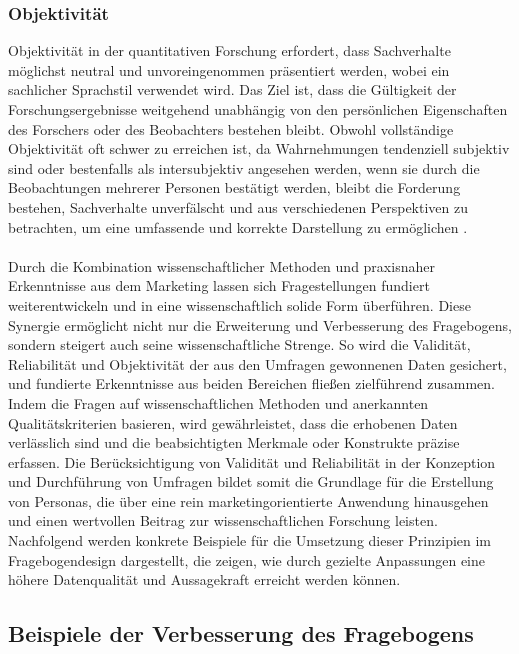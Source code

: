 \documentclass[german,report]{i1thesis}
\begin{document}
\subsubsection{Objektivität}

Objektivität in der quantitativen Forschung erfordert, dass Sachverhalte möglichst neutral und unvoreingenommen präsentiert werden, wobei ein sachlicher Sprachstil verwendet wird. Das Ziel ist, dass die Gültigkeit der Forschungsergebnisse weitgehend unabhängig von den persönlichen Eigenschaften des Forschers oder des Beobachters bestehen bleibt. Obwohl vollständige Objektivität oft schwer zu erreichen ist, da Wahrnehmungen tendenziell subjektiv sind oder bestenfalls als intersubjektiv angesehen werden, wenn sie durch die Beobachtungen mehrerer Personen bestätigt werden, bleibt die Forderung bestehen, Sachverhalte unverfälscht und aus verschiedenen Perspektiven zu betrachten, um eine umfassende und korrekte Darstellung zu ermöglichen \cite{Heesen2014}.\\
\\
Durch die Kombination wissenschaftlicher Methoden und praxisnaher Erkenntnisse aus dem Marketing lassen sich Fragestellungen fundiert weiterentwickeln und in eine wissenschaftlich solide Form überführen. Diese Synergie ermöglicht nicht nur die Erweiterung und Verbesserung des Fragebogens, sondern steigert auch seine wissenschaftliche Strenge. So wird die Validität, Reliabilität und Objektivität der aus den Umfragen gewonnenen Daten gesichert, und fundierte Erkenntnisse aus beiden Bereichen fließen zielführend zusammen. Indem die Fragen auf wissenschaftlichen Methoden und anerkannten Qualitätskriterien basieren, wird gewährleistet, dass die erhobenen Daten verlässlich sind und die beabsichtigten Merkmale oder Konstrukte präzise erfassen.
Die Berücksichtigung von Validität und Reliabilität in der Konzeption und Durchführung von Umfragen bildet somit die Grundlage für die Erstellung von Personas, die über eine rein marketingorientierte Anwendung hinausgehen und einen wertvollen Beitrag zur wissenschaftlichen Forschung leisten.
Nachfolgend werden konkrete Beispiele für die Umsetzung dieser Prinzipien im Fragebogendesign dargestellt, die zeigen, wie durch gezielte Anpassungen eine höhere Datenqualität und Aussagekraft erreicht werden können.

\subsection{Beispiele der Verbesserung des Fragebogens}
\end{document}
